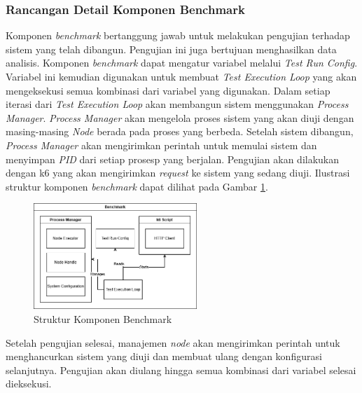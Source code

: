 \subsubsection{Rancangan Detail Komponen Benchmark}
\label{subsubsection:detail-data-benchmark}

Komponen \textit{benchmark} bertanggung jawab untuk melakukan pengujian terhadap sistem yang telah dibangun. Pengujian ini juga bertujuan menghasilkan data analisis. Komponen \textit{benchmark} dapat mengatur variabel melalui \textit{Test Run Config}. Variabel ini kemudian digunakan untuk membuat \textit{Test Execution Loop} yang akan mengeksekusi semua kombinasi dari variabel yang digunakan. Dalam setiap iterasi dari \textit{Test Execution Loop} akan membangun sistem menggunakan \textit{Process Manager}. \textit{Process Manager} akan mengelola proses sistem yang akan diuji dengan masing-masing \textit{Node} berada pada proses yang berbeda. Setelah sistem dibangun, \textit{Process Manager} akan mengirimkan perintah untuk memulai sistem dan menyimpan \textit{PID} dari setiap prosesp yang berjalan. Pengujian akan dilakukan dengan k6 yang akan mengirimkan \textit{request} ke sistem yang sedang diuji. Ilustrasi struktur komponen \textit{benchmark} dapat dilihat pada Gambar \ref{fig:benchmark-structure}.

\begin{figure}[ht]
	\centering
	\includegraphics[width=0.55\textwidth]{resources/chapter-3/benchmark-architecture.png}
	\caption{Struktur Komponen Benchmark}
	\label{fig:benchmark-structure}
\end{figure}

Setelah pengujian selesai, manajemen \textit{node} akan mengirimkan perintah untuk menghancurkan sistem yang diuji dan membuat ulang dengan konfigurasi selanjutnya. Pengujian akan diulang hingga semua kombinasi dari variabel selesai dieksekusi.